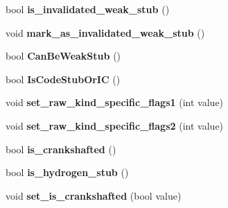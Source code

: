 \begin{DoxyCompactItemize}
\item 
\hypertarget{classv8_1_1internal_1_1_code_ab9f9f86b23c3a9f203e7eda2513816ab}{}bool {\bfseries is\+\_\+invalidated\+\_\+weak\+\_\+stub} ()\label{classv8_1_1internal_1_1_code_ab9f9f86b23c3a9f203e7eda2513816ab}

\item 
\hypertarget{classv8_1_1internal_1_1_code_ab8650a227d539122011b0d6487cbfe1d}{}void {\bfseries mark\+\_\+as\+\_\+invalidated\+\_\+weak\+\_\+stub} ()\label{classv8_1_1internal_1_1_code_ab8650a227d539122011b0d6487cbfe1d}

\item 
\hypertarget{classv8_1_1internal_1_1_code_aed3fa1f72172dac9dacdb1b4c7b4d947}{}bool {\bfseries Can\+Be\+Weak\+Stub} ()\label{classv8_1_1internal_1_1_code_aed3fa1f72172dac9dacdb1b4c7b4d947}

\item 
\hypertarget{classv8_1_1internal_1_1_code_a1c2f8f4399bbbc5c12e66d5a6276619c}{}bool {\bfseries Is\+Code\+Stub\+Or\+I\+C} ()\label{classv8_1_1internal_1_1_code_a1c2f8f4399bbbc5c12e66d5a6276619c}

\item 
\hypertarget{classv8_1_1internal_1_1_code_a1cfaa27bb25be863d031725ca5449556}{}void {\bfseries set\+\_\+raw\+\_\+kind\+\_\+specific\+\_\+flags1} (int value)\label{classv8_1_1internal_1_1_code_a1cfaa27bb25be863d031725ca5449556}

\item 
\hypertarget{classv8_1_1internal_1_1_code_adf467d7a944656df2f95b6489badab52}{}void {\bfseries set\+\_\+raw\+\_\+kind\+\_\+specific\+\_\+flags2} (int value)\label{classv8_1_1internal_1_1_code_adf467d7a944656df2f95b6489badab52}

\item 
\hypertarget{classv8_1_1internal_1_1_code_ab4a2f17928fc93c6e76e17c07cf212e1}{}bool {\bfseries is\+\_\+crankshafted} ()\label{classv8_1_1internal_1_1_code_ab4a2f17928fc93c6e76e17c07cf212e1}

\item 
\hypertarget{classv8_1_1internal_1_1_code_ae2a6962a1fa9eb5f18831eddbb8009ab}{}bool {\bfseries is\+\_\+hydrogen\+\_\+stub} ()\label{classv8_1_1internal_1_1_code_ae2a6962a1fa9eb5f18831eddbb8009ab}

\item 
\hypertarget{classv8_1_1internal_1_1_code_aae0224409dee97755ba3c34da113460b}{}void {\bfseries set\+\_\+is\+\_\+crankshafted} (bool value)\label{classv8_1_1internal_1_1_code_aae0224409dee97755ba3c34da113460b}


\end{DoxyCompactItemize}

